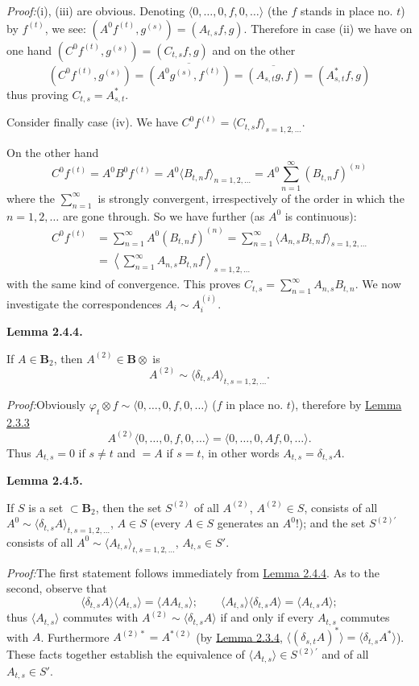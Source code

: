 \documentclass[12pt,b5paper,twoside]{article}
\newcommand{\B}{\mathbf B}
\newcommand{\Lemma}[1]{%
  \par\smallskip\noindent\phantomsection\label{lem:#1}\textbf{Lemma #1.}\enspace
}
\newcommand{\Proof}{\par\noindent\textit{Proof:}\enspace}
\newcommand{\lemref}[1]{\hyperref[lem:#1]{Lemma #1}}
\begin{document}
\Proof (i), (iii) are obvious. Denoting
$\langle0,\ldots,0,f,0,\ldots\rangle$ (the $f$ stands in place no. $t$) by
$f^{(t)}$, we see: $(A^0f^{(t)},g^{(s)})=(A_{t,s}f,g)$. Therefore in case
(ii) we have on one hand $(C^0f^{(t)},g^{(s)})=(C_{t,s}f,g)$ and on the
other
\[
 (C^0f^{(t)},g^{(s)})
 =\overline{(A^0g^{(s)},f^{(t)})}
 =\overline{(A_{s,t}g,f)}=(A_{s,t}^*f,g)
\]
thus proving $C_{t,s}=A_{s,t}^*$.

Consider finally case (iv). We have
$C^0f^{(t)}=\langle C_{t,s}f\rangle_{s=1,2,\ldots}$.

On the other hand
\[
 C^0f^{(t)}=A^0B^0f^{(t)}
 =A^0\langle B_{t,n}f\rangle_{n=1,2,\ldots}
 =A^0\sum_{n=1}^{\infty}(B_{t,n}f)^{(n)}
\]
where the $\sum_{n=1}^{\infty}$ is strongly convergent, irrespectively of the
order in which the $n=1,2,\ldots$ are gone through. So we have further (as
$A^0$ is continuous):
\begin{align*}
 C^0f^{(t)}
 &=\sum_{n=1}^{\infty}A^0(B_{t,n}f)^{(n)}
  =\sum_{n=1}^{\infty}
       \langle A_{n,s}B_{t,n}f\rangle_{s=1,2,\ldots}\\
 &=\left\langle\sum_{n=1}^{\infty}A_{n,s}B_{t,n}f
   \right\rangle_{s=1,2,\ldots}
\end{align*}
with the same kind of convergence. This proves
$C_{t,s}=\sum_{n=1}^{\infty}A_{n,s}B_{t,n}$. We now investigate the
correspondences $A_i\sim A_i^{(i)}$.

\Lemma{2.4.4}
If $A\in\B_2$, then $A^{(2)}\in\B\otimes$ is
\[
 A^{(2)}\sim\langle\delta_{t,s}A\rangle_{t,s=1,2,\ldots}.
\]

\Proof Obviously
$\varphi_t\otimes f\sim\langle0,\ldots,0,f,0,\ldots\rangle$ ($f$ in place
no. $t$), therefore by \lemref{2.3.3}
\[
 A^{(2)}\langle0,\ldots,0,f,0,\ldots\rangle
 =\langle0,\ldots,0,Af,0,\ldots\rangle.
\]
Thus $A_{t,s}=0$ if $s\ne t$ and $=A$ if $s=t$, in other words
$A_{t,s}=\delta_{t,s}A$.

\Lemma{2.4.5}
If $S$ is a set $\subset\B_2$, then the set $S^{(2)}$ of all $A^{(2)}$,
$A^{(2)}\in S$, consists of all
$A^0\sim\langle\delta_{t,s}A\rangle_{t,s=1,2,\ldots}$, $A\in S$ (every
$A\in S$ generates an $A^0$!); and the set $S^{(2)'}$ consists of all
$A^0\sim\langle A_{t,s}\rangle_{t,s=1,2,\ldots}$, $A_{t,s}\in S'$.

\Proof The first statement follows immediately from \lemref{2.4.4}. As to
the second, observe that
\[
 \langle\delta_{t,s}A\rangle\langle A_{t,s}\rangle
   =\langle AA_{t,s}\rangle;\qquad
 \langle A_{t,s}\rangle\langle\delta_{t,s}A\rangle
   =\langle A_{t,s}A\rangle;
\]
thus $\langle A_{t,s}\rangle$ commutes with
$A^{(2)}\sim\langle\delta_{t,s}A\rangle$ if and only if every $A_{t,s}$
commutes with $A$. Furthermore $A^{(2)*}=A^{*(2)}$ (by \lemref{2.3.4},
$\langle(\delta_{s,t}A)^*\rangle=\langle\delta_{t,s}A^*\rangle$). These
facts together establish the equivalence of
$\langle A_{t,s}\rangle\in S^{(2)'}$ and of all $A_{t,s}\in S'$.
\end{document}
